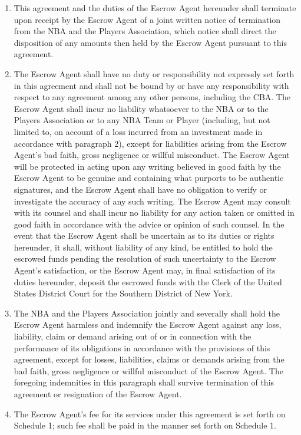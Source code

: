 \documentclass[
]{book}
\begin{document}
\begin{enumerate}
\item
  This agreement and the duties of the Escrow Agent hereunder shall terminate upon receipt by the Escrow Agent of a joint written notice of termination from the NBA and the Players Association, which notice shall direct the disposition of any amounts then held by the Escrow Agent pursuant to this agreement.
\item
  The Escrow Agent shall have no duty or responsibility not expressly set forth in this agreement and shall not be bound by or have any responsibility with respect to any agreement among any other persons, including the CBA. The Escrow Agent shall incur no liability whatsoever to the NBA or to the Players Association or to any NBA Team or Player (including, but not limited to, on account of a loss incurred from an investment made in accordance with paragraph 2), except for liabilities arising from the Escrow Agent's bad faith, gross negligence or willful misconduct. The Escrow Agent will be protected in acting upon any writing believed in good faith by the Escrow Agent to be genuine and containing what purports to be authentic signatures, and the Escrow Agent shall have no obligation to verify or investigate the accuracy of any such writing. The Escrow Agent may consult with its counsel and shall incur no liability for any action taken or omitted in good faith in accordance with the advice or opinion of such counsel. In the event that the Escrow Agent shall be uncertain as to its duties or rights hereunder, it shall, without liability of any kind, be entitled to hold the escrowed funds pending the resolution of such uncertainty to the Escrow Agent's satisfaction, or the Escrow Agent may, in final satisfaction of its duties hereunder, deposit the escrowed funds with the Clerk of the United States District Court for the Southern District of New York.
\item
  The NBA and the Players Association jointly and severally shall hold the Escrow Agent harmless and indemnify the Escrow Agent against any loss, liability, claim or demand arising out of or in connection with the performance of its obligations in accordance with the provisions of this agreement, except for losses, liabilities, claims or demands arising from the bad faith, gross negligence or willful misconduct of the Escrow Agent. The foregoing indemnities in this paragraph shall survive termination of this agreement or resignation of the Escrow Agent.
\item
  The Escrow Agent's fee for its services under this agreement is set forth on Schedule 1; such fee shall be paid in the manner set forth on Schedule 1.

\end{enumerate}
\end{document}

